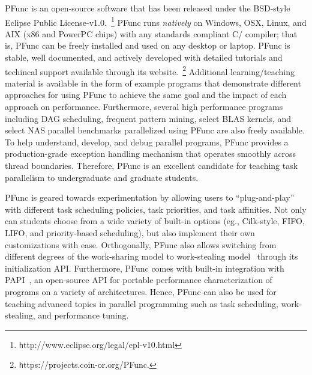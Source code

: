 \documentclass[9pt,twocolumn,letter]{article}
\begin{document}
%
%
PFunc is an open-source software that has been released under the BSD-style
Eclipse Public License-v1.0.~\footnote{\texttt
http://www.eclipse.org/legal/epl-v10.html}
%
PFunc runs \textit{natively} on Windows, OSX, Linux, and AIX (x86 and
PowerPC chips) with any standards compliant C/\Cpp{} compiler; that is, PFunc
can be freely installed and used on any desktop or laptop.
%
PFunc is stable, well documented, and actively developed with detailed
tutorials and techincal support available through its
website.~\footnote{\texttt https://projects.coin-or.org/PFunc.}
%
Additional learning/teaching material is available in the form of example
programs that demonstrate different approaches for using PFunc to achieve the
same goal and the impact of each approach on performance.
%
Furthermore, several high performance programs including DAG scheduling,
frequent pattern mining, select BLAS kernels, and select NAS parallel
benchmarks parallelized using PFunc are also freely available.
%
To help understand, develop, and debug parallel programs, PFunc provides a
production-grade exception handling mechanism that operates smoothly across
thread boundaries.
%
Therefore, PFunc is an excellent candidate for teaching task parallelism to 
undergraduate and graduate students.

%
%
PFunc is geared towards experimentation by allowing users to ``plug-and-play''
with different task scheduling policies, task priorities, and task affinities.
%
Not only can students choose from a wide variety of built-in options (eg.,
Cilk-style, FIFO, LIFO, and priority-based scheduling), but also implement
their own customizations with ease.
%
Orthogonally, PFunc also allows switching from different degrees of the
work-sharing model to work-stealing model~\cite{Blumofe94} through its
initialization API.
%
Furthermore, PFunc comes with built-in integration with PAPI~\cite{papi}, an
open-source API for portable performance characterization of programs on a
variety of architectures. 
%
Hence, PFunc can also be used for teaching advanced topics in parallel
programming such as task scheduling, work-stealing, and performance tuning. 

%
%
\end{document}
